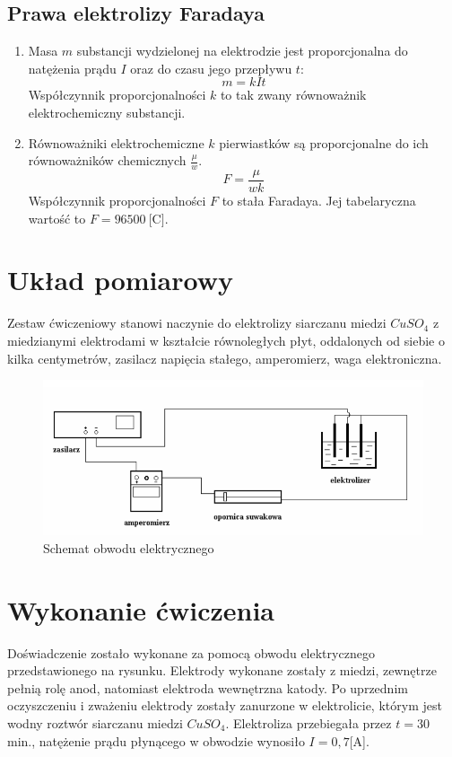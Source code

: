 \documentclass{article}
\begin{document}
\subsection{Prawa elektrolizy Faradaya}
\begin{enumerate}[I]
	\item Masa $m$ substancji wydzielonej na elektrodzie jest proporcjonalna do natężenia prądu $I$ oraz do czasu jego przepływu $t$: $$ m = kIt $$ Współczynnik proporcjonalności $k$ to tak zwany równoważnik elektrochemiczny substancji.
	
	\item Równoważniki elektrochemiczne $k$ pierwiastków są proporcjonalne do ich równoważników chemicznych $\frac{\mu}{w}$.
	$$F = \frac{\mu}{wk} $$
	Współczynnik proporcjonalności $F$ to stała Faradaya. Jej tabelaryczna wartość to $F = 96500\ \mbox{[C]}$.
\end{enumerate}

\section{Układ pomiarowy}
Zestaw ćwiczeniowy stanowi naczynie do elektrolizy siarczanu miedzi $CuSO_{4}$ z miedzianymi elektrodami w kształcie równoległych płyt, oddalonych od siebie o kilka centymetrów, zasilacz napięcia stałego, amperomierz, waga elektroniczna.
\begin{figure}[!htb]
	\centering
	\includegraphics[scale=0.65]{obwod.png}
	\caption{Schemat obwodu elektrycznego}
\end{figure}	
\section{Wykonanie ćwiczenia}
Doświadczenie zostało wykonane za pomocą obwodu elektrycznego przedstawionego na rysunku. Elektrody wykonane zostały z miedzi, zewnętrze pełnią rolę anod, natomiast elektroda wewnętrzna katody. Po uprzednim oczyszczeniu i zważeniu elektrody zostały zanurzone w elektrolicie, którym jest wodny roztwór siarczanu miedzi $CuSO_{4}$. Elektroliza przebiegała przez $t = 30$ min., natężenie prądu płynącego w obwodzie wynosiło $I = 0,7$\mbox{[A]}.
	
\end{document}
